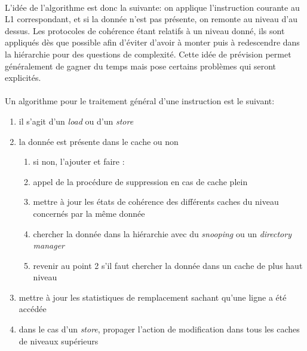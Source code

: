 \paragraph{}
L'idée de l'algorithme est donc la suivante: on applique l'instruction courante au L1 correspondant, et si la donnée n'est pas présente, on remonte au niveau d'au dessus. Les protocoles de cohérence étant relatifs à un niveau donné, ils sont appliqués dès que possible afin d'éviter d'avoir à monter puis à redescendre dans la hiérarchie pour des questions de complexité. Cette idée de prévision permet généralement de gagner du temps mais pose certains problèmes qui seront explicités.

\paragraph{}
Un algorithme pour le traitement général d'une instruction est le suivant: 
\begin{enumerate}
  \item{il s'agit d'un \emph{load} ou d'un \emph{store}}
  \item{la donnée est présente dans le cache ou non
      \begin{enumerate}
      \item{si non, l'ajouter et faire :}
      \item{appel de la procédure de suppression en cas de cache plein}
      \item{mettre à jour les états de cohérence des différents caches du niveau concernés par la même donnée}
      \item{chercher la donnée dans la hiérarchie avec du \emph{snooping} ou un \emph{directory manager}}
      \item{revenir au point 2 s'il faut chercher la donnée dans un cache de plus haut niveau}
  \end{enumerate}}
  \item{mettre à jour les statistiques de remplacement sachant qu'une ligne a été accédée}
  \item{dans le cas d'un \emph{store}, propager l'action de modification dans tous les caches de niveaux supérieurs}
\end{enumerate}


